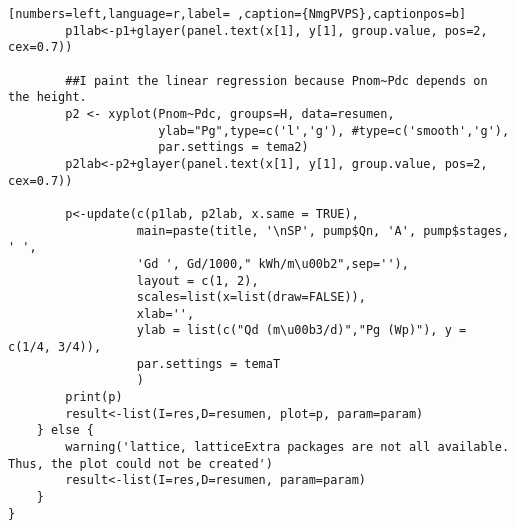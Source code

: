 \begin{lstlisting}[numbers=left,language=r,label= ,caption={NmgPVPS},captionpos=b]
        p1lab<-p1+glayer(panel.text(x[1], y[1], group.value, pos=2, cex=0.7))

        ##I paint the linear regression because Pnom~Pdc depends on the height.
        p2 <- xyplot(Pnom~Pdc, groups=H, data=resumen,
                     ylab="Pg",type=c('l','g'), #type=c('smooth','g'),
                     par.settings = tema2)
        p2lab<-p2+glayer(panel.text(x[1], y[1], group.value, pos=2, cex=0.7))

        p<-update(c(p1lab, p2lab, x.same = TRUE),
                  main=paste(title, '\nSP', pump$Qn, 'A', pump$stages, ' ',
                  'Gd ', Gd/1000," kWh/m\u00b2",sep=''),
                  layout = c(1, 2),
                  scales=list(x=list(draw=FALSE)),
                  xlab='',              
                  ylab = list(c("Qd (m\u00b3/d)","Pg (Wp)"), y = c(1/4, 3/4)),
                  par.settings = temaT
                  )
        print(p)
        result<-list(I=res,D=resumen, plot=p, param=param)
    } else {
        warning('lattice, latticeExtra packages are not all available. Thus, the plot could not be created')
        result<-list(I=res,D=resumen, param=param)
    }
}
\end{lstlisting}
